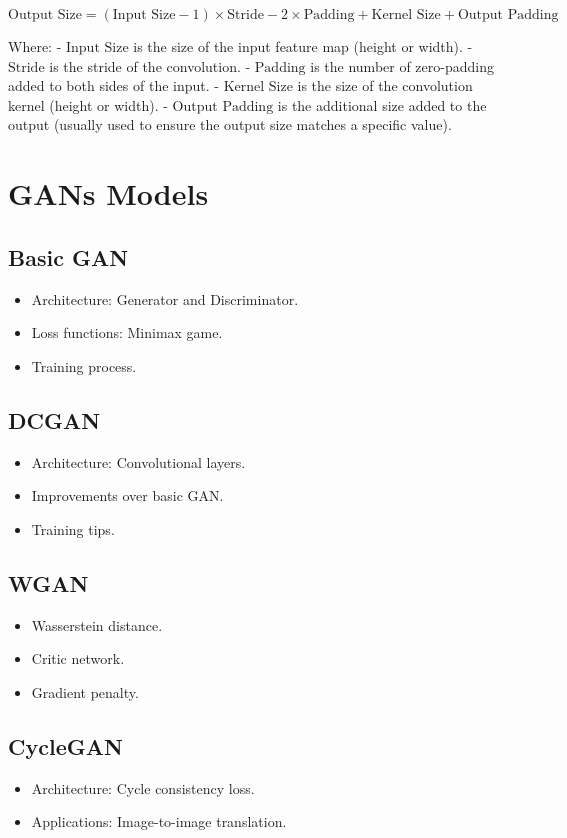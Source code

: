 \documentclass{article}
\begin{document}
\[ \text{Output Size} = (\text{Input Size} - 1) \times \text{Stride} - 2 \times \text{Padding} + \text{Kernel Size} + \text{Output Padding} \]

Where:
- \(\text{Input Size}\) is the size of the input feature map (height or width).
- \(\text{Stride}\) is the stride of the convolution.
- \(\text{Padding}\) is the number of zero-padding added to both sides of the input.
- \(\text{Kernel Size}\) is the size of the convolution kernel (height or width).
- \(\text{Output Padding}\) is the additional size added to the output (usually used to ensure the output size matches a specific value).


\section{GANs Models}
\label{sec:gans-models}
\subsection{Basic GAN}
\begin{itemize}
    \item Architecture: Generator and Discriminator.
    \item Loss functions: Minimax game.
    \item Training process.
\end{itemize}

\subsection{DCGAN}
\begin{itemize}
    \item Architecture: Convolutional layers.
    \item Improvements over basic GAN.
    \item Training tips.
\end{itemize}

\subsection{WGAN}
\begin{itemize}
    \item Wasserstein distance.
    \item Critic network.
    \item Gradient penalty.
\end{itemize}

\subsection{CycleGAN}
\begin{itemize}
    \item Architecture: Cycle consistency loss.
    \item Applications: Image-to-image translation.
\end{itemize}
\end{document}
